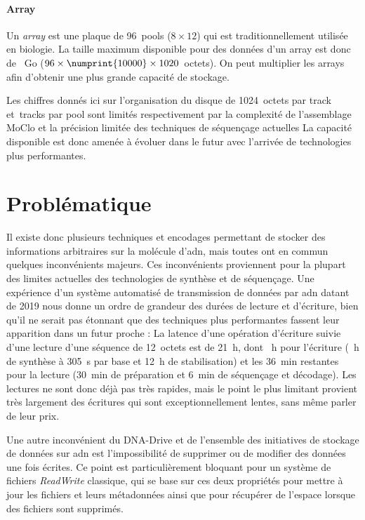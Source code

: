 \documentclass[a4paper]{report}
\begin{document}
\paragraph{Array} Un \emph{array} est une plaque de 96~pools ($8\times12$) qui est traditionnellement utilisée en biologie.
La taille maximum disponible pour des données d’un array est donc de ~Go ($96\times\numprint{10000}\times1020$~octets).
On peut multiplier les arrays afin d'obtenir une plus grande capacité de stockage.

Les chiffres donnés ici sur l’organisation du disque de 1024~octets par track et~tracks par pool sont limités respectivement par la complexité de l'assemblage MoClo et la précision limitée des techniques de séquençage actuelles
La capacité disponible est donc amenée à évoluer dans le futur avec l'arrivée de technologies plus performantes.

\section{Problématique}

Il existe donc plusieurs techniques et encodages permettant de stocker des informations arbitraires sur la molécule d'\ac{adn},
mais toutes ont en commun quelques inconvénients majeurs.
Ces inconvénients proviennent pour la plupart des limites actuelles des technologies de synthèse et de séquençage.
Une expérience d'un système automatisé de transmission de données par \ac{adn} datant de 2019 \cite{takahashi2019demonstration}
nous donne un ordre de grandeur des durées de lecture et d'écriture,
bien qu'il ne serait pas étonnant que des techniques plus performantes fassent leur apparition dans un futur proche :
La latence d'une opération d'écriture suivie d'une lecture d'une séquence de 12~octets est de 21~h,
dont ~h pour l'écriture (~h de synthèse à 305~s par base et 12~h de stabilisation)
et les 36~min restantes pour la lecture (30~min de préparation et 6~min de séquençage et décodage).
Les lectures ne sont donc déjà pas très rapides, mais le point le plus limitant provient très largement des écritures qui sont exceptionnellement lentes, sans même parler de leur prix.

Une autre inconvénient du DNA-Drive et de l'ensemble des initiatives de stockage de données sur \ac{adn} est l'impossibilité de supprimer ou de modifier des données une fois écrites.
Ce point est particulièrement bloquant pour un système de fichiers \emph{ReadWrite} classique,
qui se base sur ces deux propriétés pour mettre à jour les fichiers et leurs métadonnées ainsi que pour récupérer de l'espace lorsque des fichiers sont supprimés.
\end{document}
